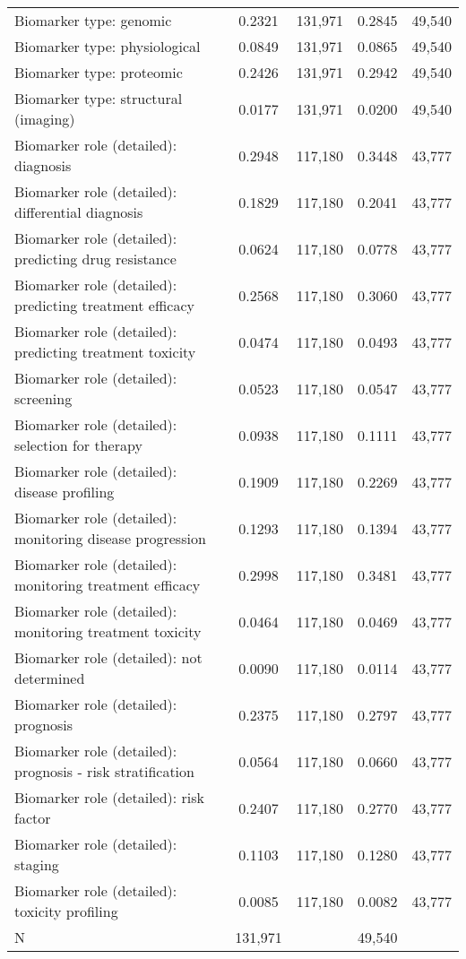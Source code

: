 \begin{table}[htbp]
\begin{tabular}{l*{2}{cc}}
Biomarker type: genomic&      0.2321&     131,971&      0.2845&      49,540\\
Biomarker type: physiological&      0.0849&     131,971&      0.0865&      49,540\\
Biomarker type: proteomic&      0.2426&     131,971&      0.2942&      49,540\\
Biomarker type: structural (imaging)&      0.0177&     131,971&      0.0200&      49,540\\
Biomarker role (detailed): diagnosis&      0.2948&     117,180&      0.3448&      43,777\\
Biomarker role (detailed): differential diagnosis&      0.1829&     117,180&      0.2041&      43,777\\
Biomarker role (detailed): predicting drug resistance&      0.0624&     117,180&      0.0778&      43,777\\
Biomarker role (detailed): predicting treatment efficacy&      0.2568&     117,180&      0.3060&      43,777\\
Biomarker role (detailed): predicting treatment toxicity&      0.0474&     117,180&      0.0493&      43,777\\
Biomarker role (detailed): screening&      0.0523&     117,180&      0.0547&      43,777\\
Biomarker role (detailed): selection for therapy&      0.0938&     117,180&      0.1111&      43,777\\
Biomarker role (detailed): disease profiling&      0.1909&     117,180&      0.2269&      43,777\\
Biomarker role (detailed): monitoring disease progression&      0.1293&     117,180&      0.1394&      43,777\\
Biomarker role (detailed): monitoring treatment efficacy&      0.2998&     117,180&      0.3481&      43,777\\
Biomarker role (detailed): monitoring treatment toxicity&      0.0464&     117,180&      0.0469&      43,777\\
Biomarker role (detailed): not determined&      0.0090&     117,180&      0.0114&      43,777\\
Biomarker role (detailed): prognosis&      0.2375&     117,180&      0.2797&      43,777\\
Biomarker role (detailed): prognosis - risk stratification&      0.0564&     117,180&      0.0660&      43,777\\
Biomarker role (detailed): risk factor&      0.2407&     117,180&      0.2770&      43,777\\
Biomarker role (detailed): staging&      0.1103&     117,180&      0.1280&      43,777\\
Biomarker role (detailed): toxicity profiling&      0.0085&     117,180&      0.0082&      43,777\\
\hline
N                   &     131,971&            &      49,540&            \\
\hline\hline
\end{tabular}
\end{table}
